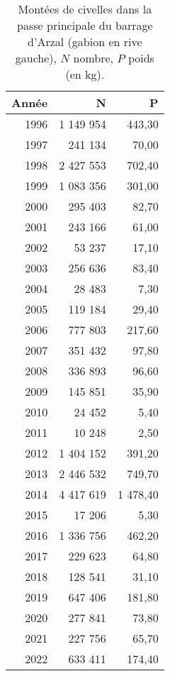 \begin{table}[htbp]
\centering
\begin{tabular}{rrr}
  \hline
Année & N & P \\ 
  \hline
1996 & 1 149 954 & 443,30 \\ 
  1997 & 241 134 & 70,00 \\ 
  1998 & 2 427 553 & 702,40 \\ 
  1999 & 1 083 356 & 301,00 \\ 
  2000 & 295 403 & 82,70 \\ 
  2001 & 243 166 & 61,00 \\ 
  2002 & 53 237 & 17,10 \\ 
  2003 & 256 636 & 83,40 \\ 
  2004 & 28 483 & 7,30 \\ 
  2005 & 119 184 & 29,40 \\ 
  2006 & 777 803 & 217,60 \\ 
  2007 & 351 432 & 97,80 \\ 
  2008 & 336 893 & 96,60 \\ 
  2009 & 145 851 & 35,90 \\ 
  2010 & 24 452 & 5,40 \\ 
  2011 & 10 248 & 2,50 \\ 
  2012 & 1 404 152 & 391,20 \\ 
  2013 & 2 446 532 & 749,70 \\ 
  2014 & 4 417 619 & 1 478,40 \\ 
  2015 & 17 206 & 5,30 \\ 
  2016 & 1 336 756 & 462,20 \\ 
  2017 & 229 623 & 64,80 \\ 
  2018 & 128 541 & 31,10 \\ 
  2019 & 647 406 & 181,80 \\ 
  2020 & 277 841 & 73,80 \\ 
  2021 & 227 756 & 65,70 \\ 
  2022 & 633 411 & 174,40 \\ 
   \hline
\end{tabular}
\caption{Montées de civelles dans la passe principale du barrage d'Arzal (gabion en rive gauche), $N$ nombre,
				$P$ poids (en kg).} 
\label{table_civelle_6}
\end{table}
